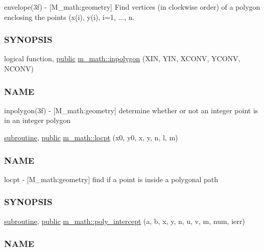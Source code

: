 \begin{DoxyCompactItemize}
\begin{DoxyCompactList}
envelope(3f) -\/ \mbox{[}M\+\_\+math\+:geometry\mbox{]} Find vertices (in clockwise order) of a polygon enclosing the points (x(i), y(i), i=1, ..., n. \subsubsection*{S\+Y\+N\+O\+P\+S\+IS}\end{DoxyCompactList}\item 
logical function, \hyperlink{M__stopwatch_83_8txt_a2f74811300c361e53b430611a7d1769f}{public} \hyperlink{namespacem__math_a8a690554ceefdd859166fd1c44b40969}{m\+\_\+math\+::inpolygon} (X\+IN, Y\+IN, X\+C\+O\+NV, Y\+C\+O\+NV, N\+C\+O\+NV)
\begin{DoxyCompactList}\small\item\em \subsubsection*{N\+A\+ME}

inpolygon(3f) -\/ \mbox{[}M\+\_\+math\+:geometry\mbox{]} determine whether or not an integer point is in an integer polygon \end{DoxyCompactList}\item 
\hyperlink{M__stopwatch_83_8txt_acfbcff50169d691ff02d4a123ed70482}{subroutine}, \hyperlink{M__stopwatch_83_8txt_a2f74811300c361e53b430611a7d1769f}{public} \hyperlink{namespacem__math_ac5b38d6e45c30842b20c944bf2e88629}{m\+\_\+math\+::locpt} (x0, y0, x, y, n, l, m)
\begin{DoxyCompactList}\small\item\em \subsubsection*{N\+A\+ME}

locpt -\/ \mbox{[}M\+\_\+math\+:geometry\mbox{]} find if a point is inside a polygonal path \subsubsection*{S\+Y\+N\+O\+P\+S\+IS}\end{DoxyCompactList}\item 
\hyperlink{M__stopwatch_83_8txt_acfbcff50169d691ff02d4a123ed70482}{subroutine}, \hyperlink{M__stopwatch_83_8txt_a2f74811300c361e53b430611a7d1769f}{public} \hyperlink{namespacem__math_ac25d73a9718db8167b0ad99331366553}{m\+\_\+math\+::poly\+\_\+intercept} (a, b, x, y, n, u, v, m, num, ierr)
\begin{DoxyCompactList}\small\item\em \subsubsection*{N\+A\+ME}


\end{DoxyCompactList}
\end{DoxyCompactItemize}

